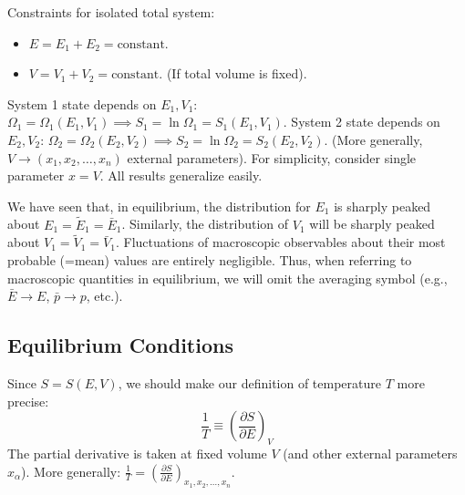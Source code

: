 \documentclass[11pt]{article}
\newcommand{\pderiv}[2]{\frac{\partial #1}{\partial #2}}
\newcommand{\tE}{\tilde{E}} %
\newcommand{\tV}{\tilde{V}} %
\begin{document}
Constraints for isolated total system:
\begin{itemize}
    \item $E = E_1 + E_2 = \text{constant}$.
    \item $V = V_1 + V_2 = \text{constant}$. (If total volume is fixed).
\end{itemize}
System 1 state depends on $E_1, V_1$: $\Omega_1 = \Omega_1(E_1, V_1) \implies S_1 = \ln \Omega_1 = S_1(E_1, V_1)$.
System 2 state depends on $E_2, V_2$: $\Omega_2 = \Omega_2(E_2, V_2) \implies S_2 = \ln \Omega_2 = S_2(E_2, V_2)$.
(More generally, $V \to (x_1, x_2, \dots, x_n)$ external parameters). For simplicity, consider single parameter $x=V$. All results generalize easily.

We have seen that, in equilibrium, the distribution for $E_1$ is sharply peaked about $E_1 = \tE_1 = \bar{E}_1$.
Similarly, the distribution of $V_1$ will be sharply peaked about $V_1 = \tV_1 = \bar{V}_1$.
Fluctuations of macroscopic observables about their most probable (=mean) values are entirely negligible. Thus, when referring to macroscopic quantities in equilibrium, we will omit the averaging symbol (e.g., $\bar{E} \to E$, $\bar{p} \to p$, etc.).

\subsection*{Equilibrium Conditions}

Since $S = S(E, V)$, we should make our definition of temperature $T$ more precise:
\[ \frac{1}{T} \equiv \left( \pderiv{S}{E} \right)_V \]
The partial derivative is taken at fixed volume $V$ (and other external parameters $x_\alpha$).
More generally: $\frac{1}{T} = \left( \pderiv{S}{E} \right)_{x_1, x_2, \dots, x_n}$.
\end{document}
